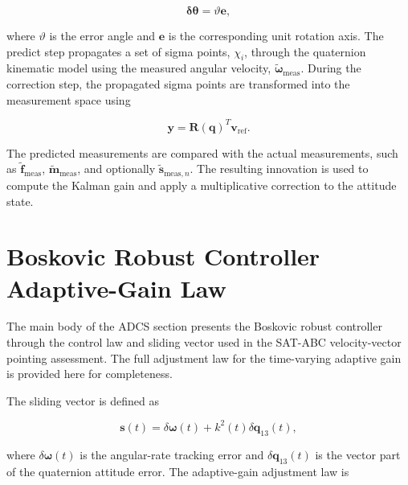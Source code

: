 \begin{equation}
    \boldsymbol{\delta\theta}
    =
    \vartheta \mathbf{e},
    \label{eq:app_adcs_ukf_rotation_error}
\end{equation}

where \(\vartheta\) is the error angle and \(\mathbf{e}\) is the corresponding unit rotation axis. The predict step propagates a set of sigma points, \(\chi_i\), through the quaternion kinematic model using the measured angular velocity, \(\tilde{\boldsymbol{\omega}}_{\mathrm{meas}}\). During the correction step, the propagated sigma points are transformed into the measurement space using

\begin{equation}
    \mathbf{y}
    =
    \mathbf{R}(\mathbf{q})^{T}
    \mathbf{v}_{\mathrm{ref}}.
    \label{eq:app_adcs_ukf_measurement_model}
\end{equation}

The predicted measurements are compared with the actual measurements, such as \(\tilde{\mathbf{f}}_{\mathrm{meas}}\), \(\tilde{\mathbf{m}}_{\mathrm{meas}}\), and optionally \(\tilde{\mathbf{s}}_{\mathrm{meas},n}\). The resulting innovation is used to compute the Kalman gain and apply a multiplicative correction to the attitude state.

\section{Boskovic Robust Controller Adaptive-Gain Law}
\label{app:adcs_boskovic_adaptive_gain}

The main body of the ADCS section presents the Boskovic robust controller through the control law and sliding vector used in the SAT-ABC velocity-vector pointing assessment. The full adjustment law for the time-varying adaptive gain is provided here for completeness.

The sliding vector is defined as

\begin{equation}
    \mathbf{s}(t)
    =
    \delta\boldsymbol{\omega}(t)
    +
    k^2(t)
    \delta\mathbf{q}_{13}(t),
    \label{eq:app_adcs_boskovic_sliding_vector}
\end{equation}

where \(\delta\boldsymbol{\omega}(t)\) is the angular-rate tracking error and \(\delta\mathbf{q}_{13}(t)\) is the vector part of the quaternion attitude error. The adaptive-gain adjustment law is

